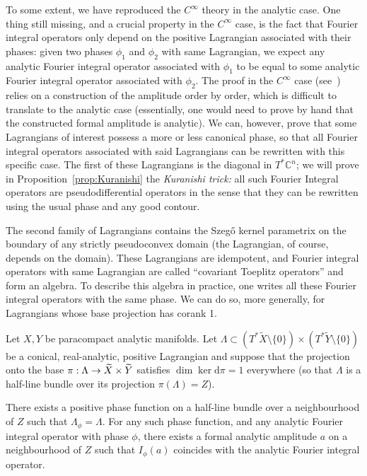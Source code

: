 \documentclass[AHL,Unicode,longabstracts,published]{cedram}
\newcommand\1{\mathds{1}}
\newcommand{\C}{\mathbb{C}}
\newcommand{\dd}{\mathrm{d}}
\renewcommand*{\to}{\mathchoice{\longrightarrow}{\rightarrow}{\rightarrow}{\rightarrow}}
\begin{document}
To some extent, we have reproduced the $C^{\infty}$ theory in the analytic case. One thing still missing, and a crucial property in the $C^{\infty}$ case, is the fact that Fourier {integral} operators only depend on the positive Lagrangian associated with their phases: given two phases $\phi_1$ and $\phi_2$ with same Lagrangian, we expect any analytic Fourier integral operator associated with $\phi_1$ to be equal to some analytic Fourier integral operator associated with $\phi_2$. The proof in the $C^{\infty}$ case (see~\cite[Proposition~25.1.5]{hormander_analysis_1985}) relies on a construction of the amplitude order by order, which is difficult to translate to the analytic case (essentially, one would need to prove by hand that the constructed formal amplitude is analytic). We can, however, prove that some Lagrangians of interest possess a more or less canonical phase, so that all Fourier integral operators associated with said Lagrangians can be rewritten with this specific case. The first of these Lagrangians is the diagonal in $T^*\C^n$; we will prove in Proposition~\ref{prop:Kuranishi} the \emph{Kuranishi trick:} all such Fourier {Integral} operators are pseudodifferential operators in the sense that they can be rewritten using the usual phase and any good contour.

The second family of Lagrangians contains the Szeg\H{o} kernel parametrix on the boundary of any strictly pseudoconvex domain (the Lagrangian, of course, depends on the domain). These Lagrangians are idempotent, and Fourier {integral operators} with same Lagrangian are called ``covariant Toeplitz operators'' and form an algebra. To describe this algebra in practice, one writes all these Fourier integral operators with the same phase. We can do so, more generally, for Lagrangians whose base projection has corank 1.

\pagebreak{}
\begin{prop}\label{prop:FIO-rank1-phase}
Let $X,Y$ be paracompact analytic manifolds. Let $\Lambda\subset (T^*\widetilde{X}\setminus \{0\})\times (T^*\widetilde{Y}\setminus
\{0\})$ be a conical, real-analytic, positive Lagrangian and suppose that the projection onto the base $\pi:\Lambda\to \widetilde{X}\times \widetilde{Y}$ satisfies $\dim
\ker \dd\pi=1$ everywhere (so that $\Lambda$ is a half-line bundle over its projection $\pi(\Lambda)=Z$).

There exists a positive phase function on a half-line bundle over a neighbourhood of $Z$ such that $\Lambda_{\phi}=\Lambda$. For any such phase function, and any analytic Fourier integral operator with phase $\phi$, there exists a formal analytic amplitude $a$ on a neighbourhood of $Z$ such that $I_{\phi}(a)$ coincides with the analytic Fourier integral operator.
\end{prop}
\end{document}
